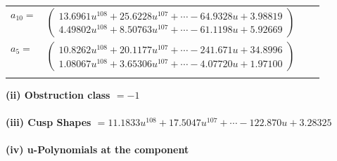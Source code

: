 \documentclass[1p]{elsarticle_modified}
\theoremstyle{definition}
\begin{document}
\begin{tabular}{m{7pt} m{180pt} m{7pt} m{180pt} }
\flushright $a_{10}=$&$\begin{pmatrix}13.6961 u^{108}+25.6228 u^{107}+\cdots-64.9328 u+3.98819\\4.49802 u^{108}+8.50763 u^{107}+\cdots-61.1198 u+5.92669\end{pmatrix}$ \\
\flushright $a_{5}=$&$\begin{pmatrix}10.8262 u^{108}+20.1177 u^{107}+\cdots-241.671 u+34.8996\\1.08067 u^{108}+3.65306 u^{107}+\cdots-4.07720 u+1.97100\end{pmatrix}$\\&\end{tabular}
\flushleft \textbf{(ii) Obstruction class $= -1$}\\~\\
\flushleft \textbf{(iii) Cusp Shapes $= 11.1833 u^{108}+17.5047 u^{107}+\cdots-122.870 u+3.28325$}\\~\\
\newpage\renewcommand{\arraystretch}{1}
\flushleft \textbf{(iv) u-Polynomials at the component}\newline \\
\end{document}
